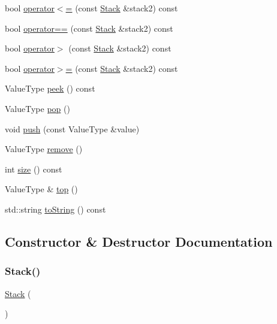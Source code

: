 \begin{DoxyCompactItemize}
\item 
bool \mbox{\hyperlink{classStack_a8037a3a4cc044bcfba994893d6f4ab12}{operator$<$=}} (const \mbox{\hyperlink{classStack}{Stack}} \&stack2) const
\item 
bool \mbox{\hyperlink{classStack_ade246b6899202c53b8fd8fbe4930b09a}{operator==}} (const \mbox{\hyperlink{classStack}{Stack}} \&stack2) const
\item 
bool \mbox{\hyperlink{classStack_a5031b32af5984055de8e2bdd4f7312c4}{operator$>$}} (const \mbox{\hyperlink{classStack}{Stack}} \&stack2) const
\item 
bool \mbox{\hyperlink{classStack_ad2ffb92607a0ad29b040677a695ccea8}{operator$>$=}} (const \mbox{\hyperlink{classStack}{Stack}} \&stack2) const
\item 
Value\+Type \mbox{\hyperlink{classStack_a7fcf31135d35acfa8ab1174c44bf28f3}{peek}} () const
\item 
Value\+Type \mbox{\hyperlink{classStack_a278630d7ff14886cdbc3585527e91733}{pop}} ()
\item 
void \mbox{\hyperlink{classStack_a3fa54a00594a4b33b29b45c98c9f6ed4}{push}} (const Value\+Type \&value)
\item 
Value\+Type \mbox{\hyperlink{classStack_a025ec97fa5b04552f5ad0902c1f02ac1}{remove}} ()
\item 
int \mbox{\hyperlink{classStack_af9593d4a5ff4274efaf429cb4f9e57cc}{size}} () const
\item 
Value\+Type \& \mbox{\hyperlink{classStack_af4e7b293e5989a3737c116dbf8f4eaf2}{top}} ()
\item 
std\+::string \mbox{\hyperlink{classStack_a1fe5121d6528fdea3f243321b3fa3a49}{to\+String}} () const
\end{DoxyCompactItemize}


\subsection{Constructor \& Destructor Documentation}
\mbox{\label{classStack_a7bda4597c418045448855db1ad87dbc5}} 
\subsubsection{\texorpdfstring{Stack()}{Stack()}\hspace{0.1cm}{\footnotesize\ttfamily [1/2]}}
{\footnotesize\ttfamily \mbox{\hyperlink{classStack}{Stack}} (\begin{DoxyParamCaption}{ }\end{DoxyParamCaption})}

